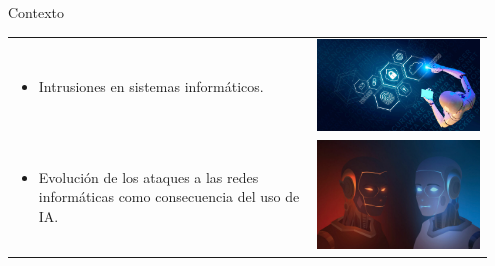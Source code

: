 \begin{frame}{Contexto}
  \renewcommand{\arraystretch}{1.8} %

  \begin{tabular}{ >{\raggedright\arraybackslash}m{0.6\linewidth} >{\centering\arraybackslash}m{0.35\linewidth} }
    \begin{itemize}
      \item Intrusiones en sistemas informáticos.
    \end{itemize} &
    \includegraphics[width=\linewidth]{./img/ciberia.png} \\
    
    \begin{itemize}
      \item Evolución de los ataques a las redes informáticas como consecuencia del uso de IA.
    \end{itemize} &
    \includegraphics[width=\linewidth]{./img/iavsia.png} \\


\end{tabular}
\end{frame}
